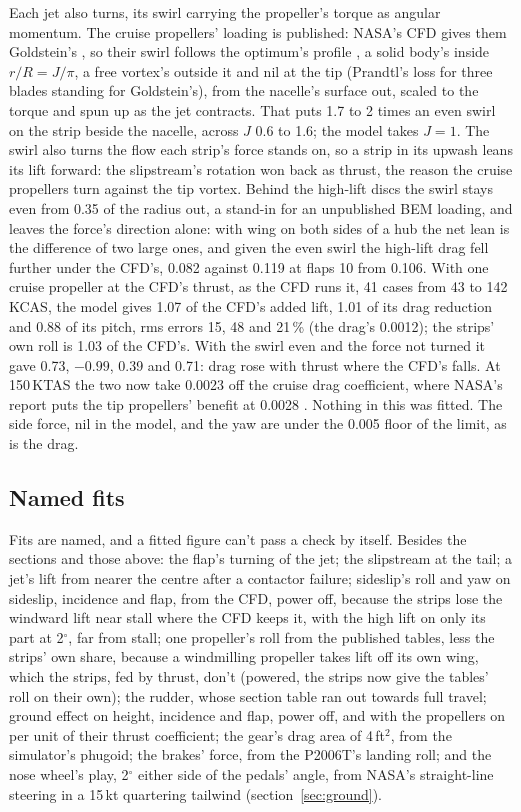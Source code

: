 \documentclass[10pt,a4paper,twocolumn]{article}
\begin{document}
Each jet also turns, its swirl carrying the propeller's torque as angular momentum. The cruise propellers' loading is published: NASA's CFD gives them Goldstein's \cite{tm}, so their swirl follows the optimum's profile \cite{gold}, a solid body's inside $r/R = J/\pi$, a free vortex's outside it and nil at the tip (Prandtl's loss for three blades standing for Goldstein's), from the nacelle's surface out, scaled to the torque and spun up as the jet contracts. That puts 1.7 to 2 times an even swirl on the strip beside the nacelle, across $J$ 0.6 to 1.6; the model takes $J=1$. The swirl also turns the flow each strip's force stands on, so a strip in its upwash leans its lift forward: the slipstream's rotation won back as thrust, the reason the cruise propellers turn against the tip vortex. Behind the high-lift discs the swirl stays even from 0.35 of the radius out, a stand-in for an unpublished BEM loading, and leaves the force's direction alone: with wing on both sides of a hub the net lean is the difference of two large ones, and given the even swirl the high-lift drag fell further under the CFD's, 0.082 against 0.119 at flaps 10 from 0.106.
With one cruise propeller at the CFD's thrust, as the CFD runs it, 41 cases from 43 to 142\,KCAS, the model gives 1.07 of the CFD's added lift, 1.01 of its drag reduction and 0.88 of its pitch, rms errors 15, 48 and 21\,\% (the drag's 0.0012); the strips' own roll is 1.03 of the CFD's. With the swirl even and the force not turned it gave 0.73, $-0.99$, 0.39 and 0.71: drag rose with thrust where the CFD's falls. At 150\,KTAS the two now take 0.0023 off the cruise drag coefficient, where NASA's report puts the tip propellers' benefit at 0.0028 \cite{tm}. Nothing in this was fitted. The side force, nil in the model, and the yaw are under the 0.005 floor of the limit, as is the drag.

\subsection{Named fits}
Fits are named, and a fitted figure can't pass a check by itself. Besides the sections and those above: the flap's turning of the jet; the slipstream at the tail; a jet's lift from nearer the centre after a contactor failure; sideslip's roll and yaw on
sideslip, incidence and flap, from the CFD, power off, because the strips lose the windward lift near stall where the CFD keeps it, with the high lift on only its part at 2$^\circ$, far from stall; one propeller's roll from the published tables, less the strips' own share, because a windmilling propeller takes lift off its own wing, which the strips, fed by thrust, don't (powered, the strips now give the tables' roll on their own); the
rudder, whose section table ran out towards full travel; ground effect on height, incidence and flap, power off, and with the propellers on per unit of their thrust coefficient; the gear's drag area of 4\,ft$^2$, from the simulator's phugoid; the brakes' force, from the P2006T's landing roll; and the nose wheel's play, 2$^\circ$ either side of the pedals' angle, from NASA's straight-line steering in a 15\,kt quartering tailwind (section~\ref{sec:ground}).
\end{document}
